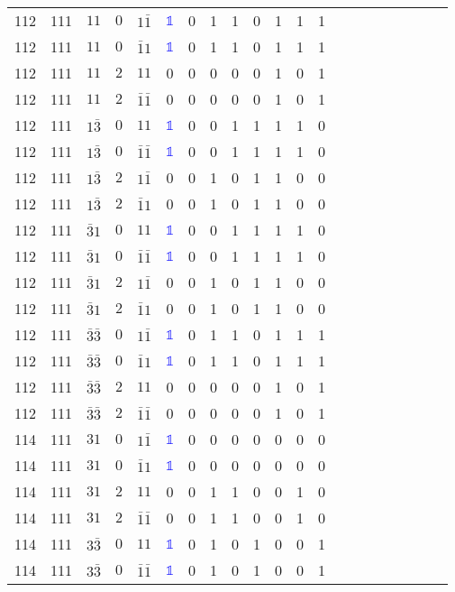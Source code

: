 \begin{longtable*}{c| cccccccccccccccccccc }
112& 111& $11$& $0$& $1\bar{1}$& \textcolor{blue}{$\mathds{1}$}& 0& 1& 1& 0& 1& 1& 1\\
112& 111& $11$& $0$& $\bar{1}1$& \textcolor{blue}{$\mathds{1}$}& 0& 1& 1& 0& 1& 1& 1\\
112& 111& $11$& $2$& $11$& 0& 0& 0& 0& 0& 1& 0& 1\\
112& 111& $11$& $2$& $\bar{1}\bar{1}$& 0& 0& 0& 0& 0& 1& 0& 1\\
112& 111& $1\bar{3}$& $0$& $11$& \textcolor{blue}{$\mathds{1}$}& 0& 0& 1& 1& 1& 1& 0\\
112& 111& $1\bar{3}$& $0$& $\bar{1}\bar{1}$& \textcolor{blue}{$\mathds{1}$}& 0& 0& 1& 1& 1& 1& 0\\
112& 111& $1\bar{3}$& $2$& $1\bar{1}$& 0& 0& 1& 0& 1& 1& 0& 0\\
112& 111& $1\bar{3}$& $2$& $\bar{1}1$& 0& 0& 1& 0& 1& 1& 0& 0\\
112& 111& $\bar{3}1$& $0$& $11$& \textcolor{blue}{$\mathds{1}$}& 0& 0& 1& 1& 1& 1& 0\\
112& 111& $\bar{3}1$& $0$& $\bar{1}\bar{1}$& \textcolor{blue}{$\mathds{1}$}& 0& 0& 1& 1& 1& 1& 0\\
112& 111& $\bar{3}1$& $2$& $1\bar{1}$& 0& 0& 1& 0& 1& 1& 0& 0\\
112& 111& $\bar{3}1$& $2$& $\bar{1}1$& 0& 0& 1& 0& 1& 1& 0& 0\\
112& 111& $\bar{3}\bar{3}$& $0$& $1\bar{1}$& \textcolor{blue}{$\mathds{1}$}& 0& 1& 1& 0& 1& 1& 1\\
112& 111& $\bar{3}\bar{3}$& $0$& $\bar{1}1$& \textcolor{blue}{$\mathds{1}$}& 0& 1& 1& 0& 1& 1& 1\\
112& 111& $\bar{3}\bar{3}$& $2$& $11$& 0& 0& 0& 0& 0& 1& 0& 1\\
112& 111& $\bar{3}\bar{3}$& $2$& $\bar{1}\bar{1}$& 0& 0& 0& 0& 0& 1& 0& 1\\
114& 111& $31$& $0$& $1\bar{1}$& \textcolor{blue}{$\mathds{1}$}& 0& 0& 0& 0& 0& 0& 0\\
114& 111& $31$& $0$& $\bar{1}1$& \textcolor{blue}{$\mathds{1}$}& 0& 0& 0& 0& 0& 0& 0\\
114& 111& $31$& $2$& $11$& 0& 0& 1& 1& 0& 0& 1& 0\\
114& 111& $31$& $2$& $\bar{1}\bar{1}$& 0& 0& 1& 1& 0& 0& 1& 0\\
114& 111& $3\bar{3}$& $0$& $11$& \textcolor{blue}{$\mathds{1}$}& 0& 1& 0& 1& 0& 0& 1\\
114& 111& $3\bar{3}$& $0$& $\bar{1}\bar{1}$& \textcolor{blue}{$\mathds{1}$}& 0& 1& 0& 1& 0& 0& 1\\

\end{longtable*}
